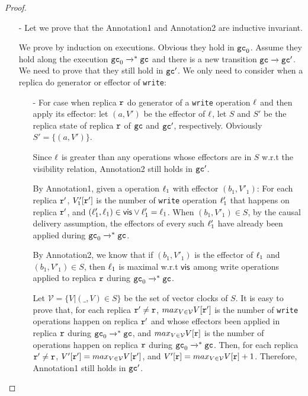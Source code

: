 \begin {proof}
\begin{itemize}
\item[-] Let we prove that the Annotation1 and Annotation2 are inductive invariant.

We prove by induction on executions. Obvious they hold in $\mathtt{gc}_0$. Assume they hold along the execution $\mathtt{gc}_0 \xrightarrow{}^* \mathtt{gc}$ and there is a new transition $\mathtt{gc} \xrightarrow{} \mathtt{gc}'$. We need to prove that they still hold in $\mathtt{gc}'$. We only need to consider when a replica do generator or effector of {\tt write}:

    \begin{itemize}
    \setlength{\itemsep}{0.5pt}
    \item[-] For case when replica $\mathtt{r}$ do generator of a {\tt write} operation $\ell$ and then apply its effector: let $(a,V')$ be the effector of $\ell$, let $S$ and $S'$ be the replica state of replica $\mathtt{r}$ of $\mathtt{gc}$ and $\mathtt{gc}'$, respectively. Obviously $S' = \{ (a,V') \}$.

        Since $\ell$ is greater than any operations whose effectors are in $S$ w.r.t the visibility relation, Annotation2 still holds in $\mathtt{gc}'$.

        By Annotation1, given a operation $\ell_1$ with effector $(b_1,V'_1)$: For each replica $\mathtt{r}'$, $V'_1[\mathtt{r}']$ is the number of {\tt write} operation $\ell'_1$ that happens on replica $\mathtt{r}'$, and $(\ell'_1,\ell_1) \in \mathsf{vis} \vee \ell'_1 = \ell_1$. When $(b_1,V'_1) \in S$, by the causal delivery assumption, the effectors of every such $\ell'_1$ have already been applied during $\mathtt{gc}_0 \xrightarrow{}^* \mathtt{gc}$.

        By Annotation2, we know that if $(b_1,V'_1)$ is the effector of $\ell_1$ and $(b_1,V'_1) \in S$, then $\ell_1$ is maximal w.r.t $\mathsf{vis}$ among write operations applied to replica $\mathtt{r}$ during $\mathtt{gc}_0 \xrightarrow{}^* \mathtt{gc}$.

        Let $\mathcal{V} = \{ V \vert (\_,V) \in S \}$ be the set of vector clocks of $S$. It is easy to prove that, for each replica $\mathtt{r}' \neq \mathtt{r}$, $max_{V \in \mathcal{V}} V[\mathtt{r}']$ is the number of {\tt write} operations happen on replica $\mathtt{r}'$ and whose effectors been applied in replica $\mathtt{r}$ during $\mathtt{gc}_0 \xrightarrow{}^* \mathtt{gc}$, and $max_{V \in \mathcal{V}} V[\mathtt{r}]$ is the number of operations happen on replica $\mathtt{r}$ during $\mathtt{gc}_0 \xrightarrow{}^* \mathtt{gc}$. Then, for each replica $\mathtt{r}' \neq \mathtt{r}$, $V'[\mathtt{r}'] = max_{V \in \mathcal{V}} V[\mathtt{r}']$, and $V'[\mathtt{r}] = max_{V \in \mathcal{V}} V[\mathtt{r}] +1$. Therefore, Annotation1 still holds in $\mathtt{gc}'$.


\end{itemize}
\end{itemize}
\end{proof}
